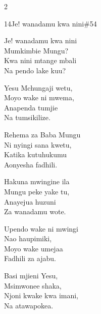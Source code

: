 \documentclass{article}
\begin{document}
\begin{multicols}{2}
\begin{hymn}{14}{Je! wanadamu kwa nini}{\#54}
\begin{stanza}
Je! wanadamu kwa nini\\
Mumkimbie Mungu?\\
Kwa nini mtange mbali\\
Na pendo lake kuu?
\end{stanza}
\begin{stanza}
Yesu Mchungaji wetu,\\
Moyo wake ni mwema,\\
Anapenda tumjie\\
Na tumsikilize.
\end{stanza}
\begin{stanza}
Rehema za Baba Mungu\\
Ni nyingi sana kwetu,\\
Katika kutuhukumu\\
Aonyesha fadhili.
\end{stanza}
\begin{stanza}
Hakuna mwingine ila\\
Mungu peke yake tu,\\
Anayejua huzuni\\
Za wanadamu wote.
\end{stanza}
\begin{stanza}
Upendo wake ni mwingi\\
Nao haupimiki,\\
Moyo wake umejaa\\
Fadhili za ajabu.
\end{stanza}
\begin{stanza}
Basi mjieni Yesu,\\
Msimwonee shaka,\\
Njoni kwake kwa imani,\\
Na atawapokea.
\end{stanza}
\end{hymn}


\end{multicols}
\end{document}
